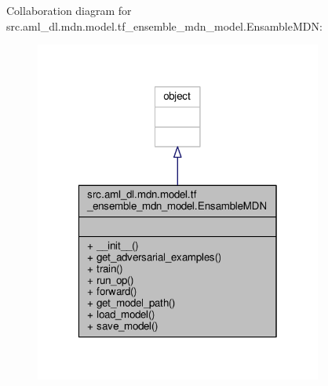 Collaboration diagram for src.\-aml\-\_\-dl.\-mdn.\-model.\-tf\-\_\-ensemble\-\_\-mdn\-\_\-model.\-Ensamble\-M\-D\-N\-:\nopagebreak
\begin{figure}[H]
\begin{center}
\leavevmode
\includegraphics[width=268pt]{classsrc_1_1aml__dl_1_1mdn_1_1model_1_1tf__ensemble__mdn__model_1_1_ensamble_m_d_n__coll__graph}
\end{center}
\end{figure}
